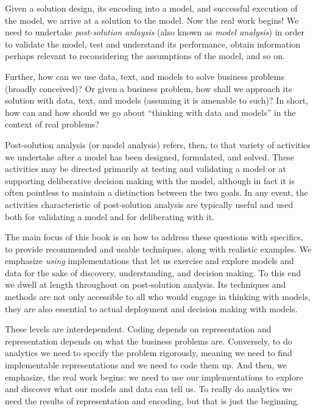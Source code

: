 \begin{enumerate}
 Given a solution design, its encoding into a model, and successful execution of the model, we arrive at a solution to the model. Now the real work begins! We need to undertake \emph{post-solution anlaysis} (also known as \emph{model analysis}) in order to validate the model, test and understand its performance, obtain information perhaps relevant to reconsidering the assumptions of the model, and so on.


Further, how can we use data, text, and models to solve business problems (broadly conceived)?  Or given a business problem, how shall we approach its solution with data, text, and models (assuming it is amenable to such)?  In short, how can and how should we go about ``thinking with data and models'' in the context of real problems?

Post-solution analysis (or model analysis) refers, then, to that variety of activities we undertake after a model has been designed, formulated, and solved.  These activities may be directed primarily at testing and validating a model or at supporting deliberative decision making with the model, although in fact it is often pointless to maintain a distinction between the two goals. In any event, the activities characteristic of post-solution analysis are typically useful and used both for validating a model and for deliberating with it. 



\end{enumerate}

The main focus of this book is on how to address these questions with specifics, to provide recommended and usable techniques, along with realistic examples. We emphasize \emph{using} implementations that let us exercise and explore models and data for the sake of discovery, understanding, and decision making. To this end we dwell at length throughout on post-solution analysis. Its techniques and methods are not only accessible to all who would engage in  thinking with models, they are also essential to actual deployment and decision making with models.

These levels are interdependent. Coding depends on representation and representation depends on what the business problems are. Conversely, to do analytics we need to specify the problem rigorously, meaning we need to find implementable representations and we need to code them up. And then, we emphasize, the real work begins: we need to use our implementations to explore and discover what our models and data can tell us. To really do analytics we need the results of representation and encoding, but that is just the beginning. %

